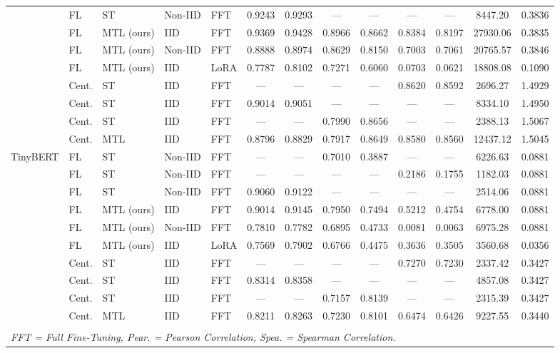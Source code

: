 \begin{table}[t]
\begin{tabular}{lllllcccccccc}
     & FL & ST & Non-IID & FFT & 0.9243 & 0.9293 & --- & --- & --- & --- & 8447.20 & 0.3836 \\
      & FL & MTL (ours) & IID & FFT & 0.9369 & 0.9428 & 0.8966 & 0.8662 & 0.8384 & 0.8197 & 27930.06 & 0.3835 \\
      & FL & MTL (ours) & Non-IID & FFT & 0.8888 & 0.8974 & 0.8629 & 0.8150 & 0.7003 & 0.7061 & 20765.57 & 0.3846 \\
     & FL & MTL (ours) & IID & LoRA & 0.7787 & 0.8102 & 0.7271 & 0.6060 & 0.0703 & 0.0621 & 18808.08 & 0.1090 \\
     & Cent. & ST & IID & FFT & --- & --- & --- & --- & 0.8620 & 0.8592 & 2696.27 & 1.4929 \\
     & Cent. & ST & IID & FFT & 0.9014 & 0.9051 & --- & --- & --- & --- & 8334.10 & 1.4950 \\
     & Cent. & ST & IID & FFT & --- & --- & 0.7990 & 0.8656 & --- & --- & 2388.13 & 1.5067 \\
     & Cent. & MTL & IID & FFT & 0.8796 & 0.8829 & 0.7917 & 0.8649 & 0.8580 & 0.8560 & 12437.12 & 1.5045 \\
    \midrule
    TinyBERT \cite{jiao2019tinybert} & FL & ST & Non-IID & FFT & --- & --- & 0.7010 & 0.3887 & --- & --- & 6226.63 & 0.0881 \\
     & FL & ST & Non-IID & FFT & --- & --- & --- & --- & 0.2186 & 0.1755 & 1182.03 & 0.0881 \\
     & FL & ST & Non-IID & FFT & 0.9060 & 0.9122 & --- & --- & --- & --- & 2514.06 & 0.0881 \\
      & FL & MTL (ours) & IID & FFT & 0.9014 & 0.9145 & 0.7950 & 0.7494 & 0.5212 & 0.4754 & 6778.00 & 0.0881 \\
      & FL & MTL (ours) & Non-IID & FFT & 0.7810 & 0.7782 & 0.6895 & 0.4733 & 0.0081 & 0.0063 & 6975.28 & 0.0881 \\
     & FL & MTL (ours) & IID & LoRA & 0.7569 & 0.7902 & 0.6766 & 0.4475 & 0.3636 & 0.3505 & 3560.68 & 0.0356 \\
     & Cent. & ST & IID & FFT & --- & --- & --- & --- & 0.7270 & 0.7230 & 2337.42 & 0.3427 \\
     & Cent. & ST & IID & FFT & 0.8314 & 0.8358 & --- & --- & --- & --- & 4857.08 & 0.3427 \\
     & Cent. & ST & IID & FFT & --- & --- & 0.7157 & 0.8139 & --- & --- & 2315.39 & 0.3427 \\
     & Cent. & MTL & IID & FFT & 0.8211 & 0.8263 & 0.7230 & 0.8101 & 0.6474 & 0.6426 & 9227.55 & 0.3440 \\
    \midrule
    \bottomrule
    \addlinespace[2pt]
    \multicolumn{13}{l}{\textit{ST = Single-Task, MTL = Multi-Task Learning, Cent. = Centralized, LoRA = Low-Rank Adaptation,}} \\
    \multicolumn{13}{l}{\textit{FFT = Full Fine-Tuning, Pear. = Pearson Correlation, Spea. = Spearman Correlation.}} \\
  \end{tabular}
\end{table}




